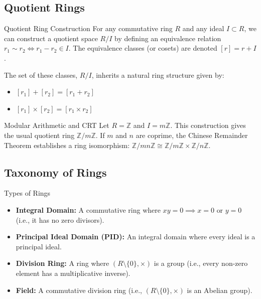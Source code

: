 \documentclass[11pt, a4paper]{article}
\newcommand{\Z}{\mathbb{Z}}
\begin{document}
\subsection{Quotient Rings}

\begin{theorem}{Quotient Ring Construction}{}
For any commutative ring $R$ and any ideal $I \subset R$, we can construct a quotient space $R/I$ by defining an equivalence relation $r_1 \sim r_2 \iff r_1 - r_2 \in I$. %
The equivalence classes (or cosets) are denoted $[r] = r + I$. %

The set of these classes, $R/I$, inherits a natural ring structure given by:
\begin{itemize}
    \item $[r_1] + [r_2] = [r_1 + r_2]$ %
    \item $[r_1] \times [r_2] = [r_1 \times r_2]$ %
\end{itemize}
\end{theorem}

\begin{example}{Modular Arithmetic and CRT}{}
Let $R = \Z$ and $I = m\Z$. %
This construction gives the usual quotient ring $\Z/m\Z$. %
If $m$ and $n$ are coprime, the Chinese Remainder Theorem establishes a ring isomorphism: $\Z/mn\Z \cong \Z/m\Z \times \Z/n\Z$. %
\end{example}

\subsection{Taxonomy of Rings}

\begin{definition}{Types of Rings}{}
\begin{itemize}
    \item \textbf{Integral Domain:} A commutative ring where $xy = 0 \implies x = 0 \text{ or } y = 0$ (i.e., it has no zero divisors). %
    \item \textbf{Principal Ideal Domain (PID):} An integral domain where every ideal is a principal ideal. %
    \item \textbf{Division Ring:} A ring where $(R \setminus \{0\}, \times)$ is a group (i.e., every non-zero element has a multiplicative inverse). %
    \item \textbf{Field:} A commutative division ring (i.e., $(R \setminus \{0\}, \times)$ is an Abelian group). %
\end{itemize}
\end{definition}
\end{document}
